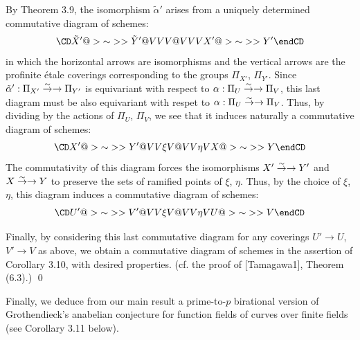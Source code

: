 By Theorem 3.9, the isomorphism $\tilde \alpha'$ arises from a 
uniquely determined commutative diagram of schemes:
$$
\CD
\Tilde X' @>{\sim}>> \Tilde Y' \\
@VVV   @VVV \\
X' @>{\sim}>> Y' \\
\endCD
$$
in which the horizontal arrows are isomorphisms and the vertical arrows are the 
profinite \'etale coverings corresponding to the groups $\Pi_{X'}$, $\Pi_{Y'}$.
Since $\tilde\alpha':\Pi_{X'}\overset \sim \to \rightarrow\Pi_{Y'}$ is 
equivariant with respect to $\alpha:\Pi_U\overset \sim \to \rightarrow \Pi_V$, 
this last diagram must be also equivariant 
with respet to $\alpha:\Pi_U\overset \sim \to \rightarrow \Pi_V$. 
Thus, by dividing by the actions of $\Pi_U$, $\Pi_V$, we see that 
it induces naturally a commutative diagram of schemes:
$$
\CD
X' @>{\sim}>> Y' \\
@VV{\xi}V   @VV{\eta}V \\
X @>{\sim}>> Y \\
\endCD
$$
The commutativity of 
this diagram forces the isomorphisms 
$X'\overset \sim \to \rightarrow Y'$ and $X\overset \sim \to \rightarrow Y$ to preserve the sets of ramified points 
of $\xi$, $\eta$. Thus, by the choice of $\xi$, $\eta$, this diagram 
induces a commutative diagram of schemes: 
$$
\CD
U' @>{\sim}>> V' \\
@VV{\xi}V   @VV{\eta}V \\
U @>{\sim}>> V \\
\endCD
$$

Finally, by considering this last commutative diagram for any 
coverings $U'\to U$, $V'\to V$ as above, we obtain 
a commutative diagram of schemes in the assertion of Corollary 3.10,  
with desired properties. (cf. the proof of [Tamagawa1], Theorem (6.3).) 
\qed
\enddemo

Finally, we deduce from our main result a prime-to-$p$ birational 
version of Grothendieck's anabelian 
conjecture for function fields of curves over finite fields
(see Corollary 3.11 below).

